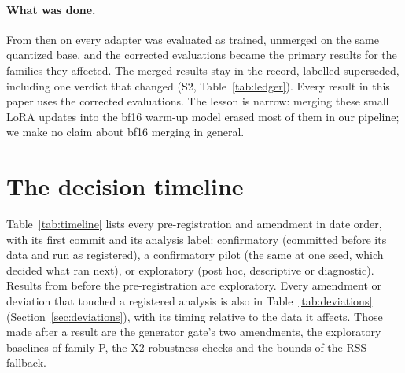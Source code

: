 \paragraph{What was done.}
From then on every adapter was evaluated as trained, unmerged on the same quantized base, and the corrected
evaluations became the primary results for the families they affected.
The merged results stay in the record, labelled superseded, including one verdict that changed (S2,
Table~\ref{tab:ledger}).
Every result in this paper uses the corrected evaluations.
The lesson is narrow: merging these small LoRA updates into the bf16 warm-up model erased most of them in our
pipeline; we make no claim about bf16 merging in general.

\section{The decision timeline}
\label{app:timeline}

Table~\ref{tab:timeline} lists every pre-registration and amendment in date order, with its first commit and its
analysis label: confirmatory (committed before its data and run as registered), a confirmatory pilot (the same at one
seed, which decided what ran next), or exploratory (post hoc, descriptive or diagnostic).
Results from before the pre-registration are exploratory.
Every amendment or deviation that touched a registered analysis is also in Table~\ref{tab:deviations}
(Section~\ref{sec:deviations}), with its timing relative to the data it affects.
Those made after a result are the generator gate's two amendments, the exploratory baselines of family P, the X2
robustness checks and the bounds of the RSS fallback.


